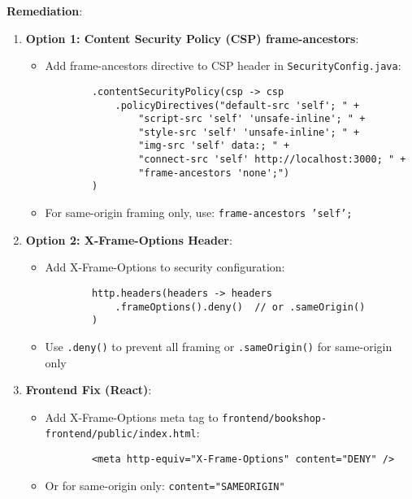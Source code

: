 \documentclass[]{UCD_CS_FYP_Report}
\begin{document}
\textbf{Remediation}:
\begin{enumerate}
    \item \textbf{Option 1: Content Security Policy (CSP) frame-ancestors}:
    \begin{itemize}
        \item Add frame-ancestors directive to CSP header in \texttt{SecurityConfig.java}:
        \begin{verbatim}
        .contentSecurityPolicy(csp -> csp
            .policyDirectives("default-src 'self'; " +
                "script-src 'self' 'unsafe-inline'; " +
                "style-src 'self' 'unsafe-inline'; " +
                "img-src 'self' data:; " +
                "connect-src 'self' http://localhost:3000; " +
                "frame-ancestors 'none';")
        )
        \end{verbatim}
        
        \item For same-origin framing only, use: \texttt{frame-ancestors 'self';}
    \end{itemize}
    
    \item \textbf{Option 2: X-Frame-Options Header}:
    \begin{itemize}
        \item Add X-Frame-Options to security configuration:
        \begin{verbatim}
        http.headers(headers -> headers
            .frameOptions().deny()  // or .sameOrigin()
        )
        \end{verbatim}
        
        \item Use \texttt{.deny()} to prevent all framing or \texttt{.sameOrigin()} for same-origin only
    \end{itemize}
    
    \item \textbf{Frontend Fix (React)}:
    \begin{itemize}
        \item Add X-Frame-Options meta tag to \texttt{frontend/bookshop-frontend/public/index.html}:
        \begin{verbatim}
        <meta http-equiv="X-Frame-Options" content="DENY" />
        \end{verbatim}
        
        \item Or for same-origin only: \texttt{content="SAMEORIGIN"}
    \end{itemize}
    

\end{enumerate}
\end{document}
